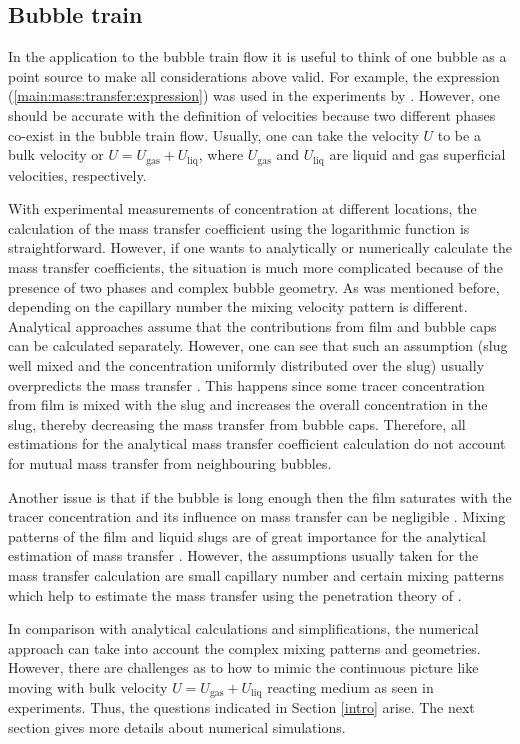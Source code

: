 \documentclass{article}
\newcommand{\uliq}{U_{\mathrm{liq}}}
\newcommand{\ugas}{U_{\mathrm{gas}}}
\begin{document}
\subsection{Bubble train}
In the application to the bubble train flow it is useful to think of one bubble as a point
source to make all considerations above valid. For example, the expression
(\ref{main:mass:transfer:expression}) was used in the experiments by
\citet{bercic-mass}. However, one should be accurate with the definition of velocities because two
different phases co-exist in the bubble train flow. Usually, one can take the velocity $U$ to be
a bulk velocity or $U=\ugas+\uliq$, where $\ugas$ and $\uliq$ are liquid and gas
superficial velocities, respectively. 

With experimental measurements of concentration at different locations, the calculation
of the mass transfer coefficient using the logarithmic function is straightforward.
However, if one wants to analytically or numerically calculate the mass transfer coefficients, the
situation is much more complicated because of the presence of two phases and complex bubble
geometry. As was mentioned before, depending on the capillary
number the mixing velocity pattern is different. Analytical approaches
\cite{irandoust,vanbaten-circular} assume that the
contributions from film and bubble caps can be calculated separately. However, one can see that
such 
an assumption (slug well mixed and the concentration uniformly distributed over
the slug) usually overpredicts the mass transfer \cite{irandoust}. This happens since some tracer
concentration from film is mixed with the slug and increases the overall concentration in the slug, thereby decreasing
the mass transfer from bubble caps.
Therefore, all estimations for the analytical mass transfer coefficient calculation  do not account for mutual mass
transfer from neighbouring bubbles.

Another issue is that if the bubble is long enough then the film saturates with the tracer
concentration and its influence on mass transfer can be negligible \cite{vanbaten-circular}.
Mixing patterns of the film and liquid slugs are of great importance for the analytical
estimation of mass transfer \cite{yue-mass}. However, the assumptions usually taken for the
mass transfer calculation are small capillary number and certain mixing patterns which help to
estimate the mass transfer using the penetration theory of \citet{higbie}.

In comparison with analytical calculations and simplifications, the numerical approach can take into
account the complex mixing patterns and geometries. However, there are challenges as to how to
mimic the continuous picture like moving with bulk velocity $U=\ugas+\uliq$ reacting medium as seen in
experiments. Thus, the questions indicated in Section \ref{intro} arise.  The next section gives more
 details about numerical simulations.
 
\end{document}
